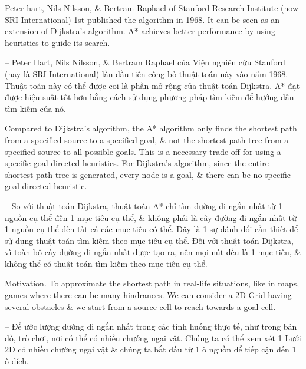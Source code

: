 \documentclass{article}
\begin{document}
\href{https://en.wikipedia.org/wiki/Peter_E._Hart}{\sc Peter hart}, \href{https://en.wikipedia.org/wiki/Nils_Nilsson_(researcher)}{\sc Nils Nilsson}, \& \href{https://en.wikipedia.org/wiki/Bertram_Raphael}{\sc Bertram Raphael} of Stanford Research Institute (now \href{https://en.wikipedia.org/wiki/SRI_International}{SRI International}) 1st published the algorithm in 1968. It can be seen as an extension of \href{https://en.wikipedia.org/wiki/Dijkstra%27s_algorithm}{Dijkstra's algorithm}. A* achieves better performance by using \href{https://en.wikipedia.org/wiki/Heuristic_(computer_science)}{heuristics} to guide its search.

-- {\sc Peter Hart, Nils Nilsson, \& Bertram Raphael} của Viện nghiên cứu Stanford (nay là SRI International) lần đầu tiên công bố thuật toán này vào năm 1968. Thuật toán này có thể được coi là phần mở rộng của thuật toán Dijkstra. A* đạt được hiệu suất tốt hơn bằng cách sử dụng phương pháp tìm kiếm để hướng dẫn tìm kiếm của nó.

Compared to Dijkstra's algorithm, the A* algorithm only finds the shortest path from a specified source to a specified goal, \& not the shortest-path tree from a specified source to all possible goals. This is a necessary \href{https://en.wikipedia.org/wiki/Trade-off}{trade-off} for using a specific-goal-directed heuristics. For Dijkstra's algorithm, since the entire shortest-path tree is generated, every node is a goal, \& there can be no specific-goal-directed heuristic.

-- So với thuật toán Dijkstra, thuật toán A* chỉ tìm đường đi ngắn nhất từ 1 nguồn cụ thể đến 1 mục tiêu cụ thể, \& không phải là cây đường đi ngắn nhất từ 1 nguồn cụ thể đến tất cả các mục tiêu có thể. Đây là 1 sự đánh đổi cần thiết để sử dụng thuật toán tìm kiếm theo mục tiêu cụ thể. Đối với thuật toán Dijkstra, vì toàn bộ cây đường đi ngắn nhất được tạo ra, nên mọi nút đều là 1 mục tiêu, \& không thể có thuật toán tìm kiếm theo mục tiêu cụ thể.

{\sf Motivation.} To approximate the shortest path in real-life situations, like in maps, games where there can be many hindrances. We can consider a 2D Grid having several obstacles \& we start from a source cell to reach towards a goal cell.

-- Để ước lượng đường đi ngắn nhất trong các tình huống thực tế, như trong bản đồ, trò chơi, nơi có thể có nhiều chướng ngại vật. Chúng ta có thể xem xét 1 Lưới 2D có nhiều chướng ngại vật \& chúng ta bắt đầu từ 1 ô nguồn để tiếp cận đến 1 ô đích.
\end{document}
